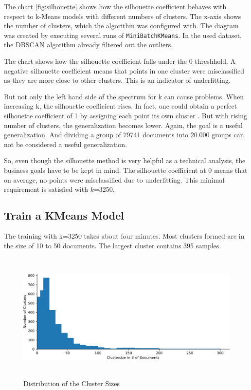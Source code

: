 The chart \ref{fig:silhouette} shows how the silhouette coefficient behaves with respect to k-Means models with different numbers of clusters. The x-axis shows the number of clusters, which the algorithm was configured with. The diagram was created by executing several runs of \lstinline|MiniBatchKMeans|. In the used dataset, the DBSCAN algorithm already filtered out the outliers.

The chart shows how the silhouette coefficient falls under the 0 threshhold. A negative silhouette coefficient means that points in one cluster were misclassified as they are more close to other clusters. This is an indicator of underfitting. 

But not only the left hand side of the spectrum for k can cause problems. When increasing k, the silhouette coefficient rises. In fact, one could obtain a perfect silhouette coefficient of 1 by assigning each point its own cluster \cite{yildirimTwoChallengesKMeans2020}. But with rising number of clusters, the generalization becomes lower. Again, the goal is a useful generalization. And dividing a group of 79741 documents into 20.000 groups can not be considered a useful generalization.

So, even though the silhouette method is very helpful as a technical analysis, the business goals have to be kept in mind. The silhouette coefficient at 0 means that on average, no points were misclassified due to underfitting. This minimal requirement is satisfied with $k$=3250.

\subsection{Train a KMeans Model}

The training with k=3250 takes about four minutes. Most clusters formed are in the size of 10 to 50 documents. The largest cluster contains 395 samples.

\begin{figure}[!h]
	\centering
	\includegraphics[height=6.5cm]{Bilder/models/clustersize.pdf}
	\caption{Distribution of the Cluster Sizes}
	\label{fig:clustersize}
\end{figure}

